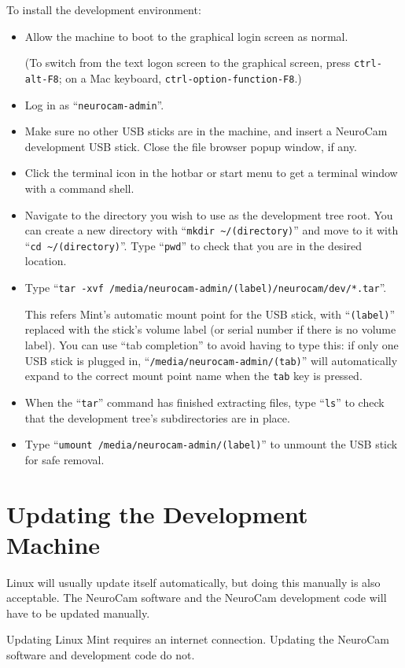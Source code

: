 To install the development environment:
\begin{itemize}
%
\item Allow the machine to boot to the graphical login screen as normal.
\par
(To switch from the text logon screen to the graphical screen, press
\verb+ctrl-alt-F8+; on a Mac keyboard, \verb+ctrl-option-function-F8+.)
\item Log in as ``\verb+neurocam-admin+''.
\item Make sure no other USB sticks are in the machine, and insert a NeuroCam
development USB stick. Close the file browser popup window, if any.
\item Click the terminal icon in the hotbar or start menu to get a terminal
window with a command shell.
\item Navigate to the directory you wish to use as the development tree root.
You can create a new directory with ``\verb+mkdir ~/(directory)+'' and move
to it with ``\verb+cd ~/(directory)+''. Type ``\verb+pwd+'' to check that you
are in the desired location.
\item Type ``\verb+tar -xvf /media/neurocam-admin/(label)/neurocam/dev/*.tar+''.
\par
This refers Mint's automatic mount point for the USB stick, with 
``\verb+(label)+'' replaced with the stick's volume label (or serial number if
there is no volume label). You can use ``tab completion'' to avoid having to
type this: if only one USB stick is plugged in, 
``\verb+/media/neurocam-admin/(tab)+'' will automatically expand to the
correct mount point name when the \verb+tab+ key is pressed.
\item When the ``\verb+tar+'' command has finished extracting files, type
``\verb+ls+'' to check that the development tree's subdirectories are in 
place.
\item Type ``\verb+umount /media/neurocam-admin/(label)+'' to unmount the
USB stick for safe removal.
%
\end{itemize}

%
%
\section{Updating the Development Machine}

Linux will usually update itself automatically, but doing this manually is
also acceptable. The NeuroCam software and the NeuroCam development code
will have to be updated manually.

Updating Linux Mint requires an internet connection. Updating the NeuroCam
software and development code do not.

